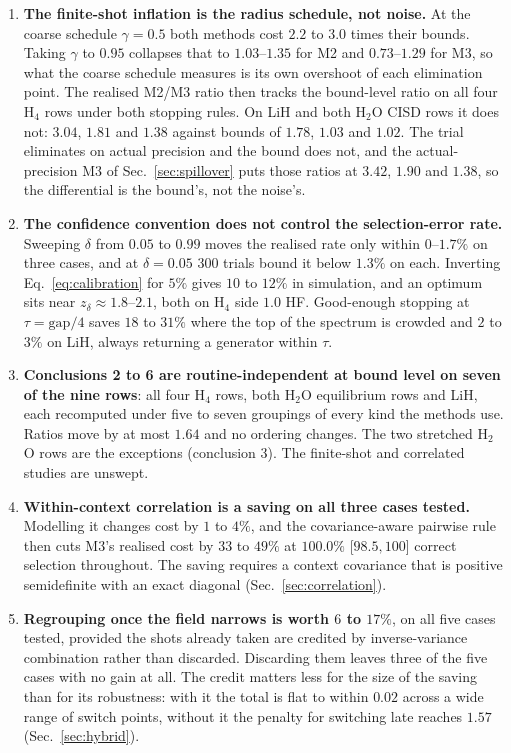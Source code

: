 \documentclass[10pt]{article}
\begin{document}
\begin{enumerate}[leftmargin=2em]
  \item \textbf{The finite-shot inflation is the radius schedule, not noise.} At the coarse schedule $\gamma=0.5$ both methods cost $2.2$ to $3.0$ times their bounds. Taking $\gamma$ to $0.95$ collapses that to $1.03$--$1.35$ for M2 and $0.73$--$1.29$ for M3, so what the coarse schedule measures is its own overshoot of each elimination point. The realised M2/M3 ratio then tracks the bound-level ratio on all four H$_4$ rows under both stopping rules. On LiH and both H$_2$O CISD rows it does not: $3.04$, $1.81$ and $1.38$ against bounds of $1.78$, $1.03$ and $1.02$. The trial eliminates on actual precision and the bound does not, and the actual-precision M3 of Sec.~\ref{sec:spillover} puts those ratios at $3.42$, $1.90$ and $1.38$, so the differential is the bound's, not the noise's.
  \item \textbf{The confidence convention does not control the selection-error rate.} Sweeping $\delta$ from $0.05$ to $0.99$ moves the realised rate only within $0$--$1.7\%$ on three cases, and at $\delta=0.05$ 300 trials bound it below $1.3\%$ on each. Inverting Eq.~\eqref{eq:calibration} for $5\%$ gives $10$ to $12\%$ in simulation, and an optimum sits near $z_\delta\approx1.8$--$2.1$, both on H$_4$ side $1.0$ HF. Good-enough stopping at $\tau=\mathrm{gap}/4$ saves $18$ to $31\%$ where the top of the spectrum is crowded and $2$ to $3\%$ on LiH, always returning a generator within $\tau$.
  \item \textbf{Conclusions 2 to 6 are routine-independent at bound level on seven of the nine rows}: all four H$_4$ rows, both H$_2$O equilibrium rows and LiH, each recomputed under five to seven groupings of every kind the methods use. Ratios move by at most $1.64$ and no ordering changes. The two stretched H$_2$O rows are the exceptions (conclusion 3). The finite-shot and correlated studies are unswept.
  \item \textbf{Within-context correlation is a saving on all three cases tested.} Modelling it changes cost by $1$ to $4\%$, and the covariance-aware pairwise rule then cuts M3's realised cost by $33$ to $49\%$ at $100.0\%$ [$98.5,100$] correct selection throughout. The saving requires a context covariance that is positive semidefinite with an exact diagonal (Sec.~\ref{sec:correlation}).
  \item \textbf{Regrouping once the field narrows is worth $6$ to $17\%$}, on all five cases tested, provided the shots already taken are credited by inverse-variance combination rather than discarded. Discarding them leaves three of the five cases with no gain at all. The credit matters less for the size of the saving than for its robustness: with it the total is flat to within $0.02$ across a wide range of switch points, without it the penalty for switching late reaches $1.57$ (Sec.~\ref{sec:hybrid}).

\end{enumerate}
\end{document}
